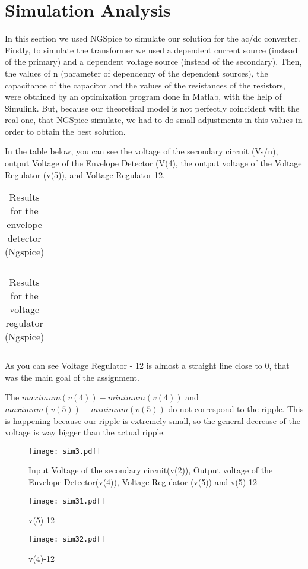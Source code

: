 \section{Simulation Analysis}
\label{simulanal}
In this section we used NGSpice to simulate our solution for the ac/dc converter. Firstly, to simulate the transformer we used a dependent current source (instead of the primary) and a dependent voltage source (instead of the secondary).
Then, the values of n (parameter of dependency of the dependent sources), the capacitance of the capacitor and the values of the resistances of the resistors, were obtained by an optimization program done in Matlab, with the help of Simulink. But, because our theoretical model is not perfectly coincident with the real one, that NGSpice simulate, we had to do small adjustments in this values in order to obtain the best solution.
\par In the table below, you can see the  voltage of the secondary circuit (Vs/n), output Voltage of the Envelope Detector (V(4), the output voltage of the Voltage Regulator (v(5)), and Voltage Regulator-12.
\par \begin{table}[h]
\centering
\begin{tabularx}{0.6\textwidth} {
  | >{\raggedright\arraybackslash}X
  | >{\raggedleft\arraybackslash}X | }
 \hline

\end{tabularx}
\caption{Results for the envelope detector (Ngspice)}
\end{table}

\begin{table}[h]
\centering
\begin{tabularx}{0.6\textwidth} {
  | >{\raggedright\arraybackslash}X
  | >{\raggedleft\arraybackslash}X | }
 \hline

\end{tabularx}
\caption{Results for the voltage regulator (Ngspice)}
\end{table}

\par As you can see Voltage Regulator - 12 is almost a straight line close to 0, that was the main goal of the assignment.
\par The $maximum(v(4))-minimum(v(4))$ and $maximum(v(5))-minimum(v(5))$ do not correspond to the ripple. This is happening because our ripple is extremely small, so the general decrease of the voltage is way bigger than the actual ripple.
\begin{figure}[H] \centering
\texttt{[image: sim3.pdf]}
\caption{Input Voltage of the secondary circuit(v(2)), Output voltage of the Envelope Detector(v(4)), Voltage Regulator (v(5)) and v(5)-12}
\label{fig:snat1}
\end{figure}
\begin{figure}[H] \centering
\texttt{[image: sim31.pdf]}
\caption{v(5)-12}
\label{fig:snat2}
\end{figure}
\begin{figure}[H] \centering
\texttt{[image: sim32.pdf]}
\caption{v(4)-12}
\label{fig:snat3}
\end{figure}


